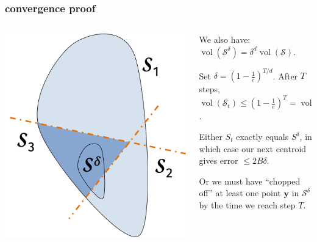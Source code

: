 \documentclass[compress]{beamer}
\newcommand{\bv}[1]{\mathbf{#1}}
\DeclareMathOperator{\vol}{vol}
\begin{document}
\begin{frame}
	\frametitle{convergence proof}
	\begin{columns}
		\begin{column}{.4\textwidth}
			\includegraphics[width=\textwidth]{cut_off.png}
		\end{column}
		\begin{column}{.6\textwidth}
			\vspace{.5em}
			
			We also have: $\vol(\mathcal{S}^\delta) = \delta^d \vol(\mathcal{S}).$
			
			\vspace{1em}
			Set $\delta = \left(1-\frac{1}{e}\right)^{T/d}$. After $T$ steps, $\vol(\mathcal{S}_t) \leq \left(1-\frac{1}{e}\right)^{T} = \vol(\mathcal{S}^\delta)$.  
			
			\vspace{1em}
			Either $S_t$ exactly equals $S^{\delta}$, in which case our next centroid gives error $\leq 2B\delta$.
			
			\vspace{1em} Or we must have ``chopped off'' at least one point $\bv{y}$ in $\mathcal{S}^\delta$ by the time we reach step $T$. 
			\vspace{1em}
			
		\end{column}
	\end{columns}
\end{frame}
\end{document}

